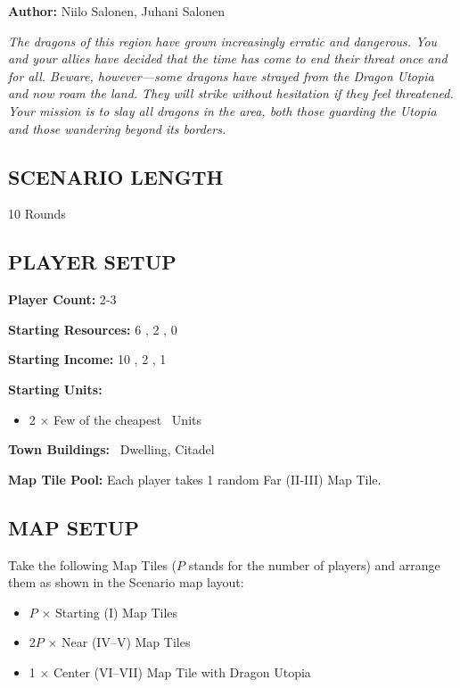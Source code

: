 
\begin{multicols}{2}

\textbf{Author:} Niilo Salonen, Juhani Salonen

\textit{The dragons of this region have grown increasingly erratic and dangerous.
You and your allies have decided that the time has come to end their threat once and for all.
Beware, however—some dragons have strayed from the Dragon Utopia and now roam the land.
They will strike without hesitation if they feel threatened.
Your mission is to slay all dragons in the area, both those guarding the Utopia and those wandering beyond its borders.}  %

\subsection*{\MakeUppercase{Scenario Length}}
10 Rounds

\subsection*{\MakeUppercase{Player Setup}}
\textbf{Player Count:} 2-3

\textbf{Starting Resources:} 6 , 2 , 0 

\textbf{Starting Income:} 10 , 2 , 1 

\textbf{Starting Units:}

\begin{itemize}
  \item 2 × Few of the cheapest \bronze\ Units
\end{itemize}

\textbf{Town Buildings:} \bronze\ Dwelling, Citadel

\textbf{Map Tile Pool:} Each player takes 1 random Far (II-III) Map Tile.

\subsection*{\MakeUppercase{Map Setup}}
Take the following Map Tiles ($P$ stands for the number of players) and arrange them as shown in the Scenario map layout:

\begin{itemize}
  \item $P$ × Starting (I) Map Tiles
  \item 2$P$ × Near (IV–V) Map Tiles
  \item 1 × Center (VI–VII) Map Tile with Dragon Utopia
\end{itemize}


\end{multicols}
